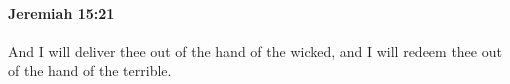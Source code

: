 
		\paragraph{Jeremiah 15:21} %
			\label{JEREMIAH-15-21}

			And I will deliver thee out of the hand of the wicked, and I will redeem thee out of the hand of the terrible.

